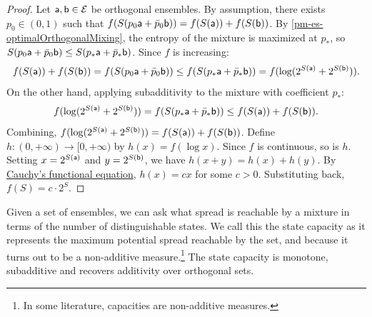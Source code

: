 \begin{mathSection}
	\begin{proof}
		Let $\ens[a],\ens[b]\in\Ens$ be orthogonal ensembles. By assumption, there exists $p_0\in(0,1)$ such that $f(S(p_0\ens[a]+\bar{p}_0\ens[b])) = f(S(\ens[a]))+f(S(\ens[b]))$. By \ref{pm-es-optimalOrthogonalMixing}, the entropy of the mixture is maximized at $p_*$, so $S(p_0\ens[a]+\bar{p}_0\ens[b]) \leq S(p_*\ens[a]+\bar{p}_*\ens[b])$. Since $f$ is increasing:
		\begin{equation}
			f(S(\ens[a]))+f(S(\ens[b])) = f(S(p_0\ens[a]+\bar{p}_0\ens[b])) \leq f(S(p_*\ens[a]+\bar{p}_*\ens[b])) = f(\log(2^{S(\ens[a])}+2^{S(\ens[b])})).
		\end{equation}
		On the other hand, applying subadditivity to the mixture with coefficient $p_*$:
		\begin{equation}
			f(\log(2^{S(\ens[a])}+2^{S(\ens[b])})) = f(S(p_*\ens[a]+\bar{p}_*\ens[b])) \leq f(S(\ens[a]))+f(S(\ens[b])).
		\end{equation}
		Combining, $f(\log(2^{S(\ens[a])}+2^{S(\ens[b])})) = f(S(\ens[a]))+f(S(\ens[b]))$. Define $h:(0,+\infty)\to[0,+\infty)$ by $h(x)=f(\log x)$. Since $f$ is continuous, so is $h$. Setting $x=2^{S(\ens[a])}$ and $y=2^{S(\ens[b])}$, we have $h(x+y)=h(x)+h(y)$. By \href{https://en.wikipedia.org/wiki/Cauchy%27s_functional_equation}{Cauchy's functional equation}, $h(x)=cx$ for some $c>0$. Substituting back, $f(S)=c \cdot 2^S$.
	\end{proof}

\end{mathSection}

Given a set of ensembles, we can ask what spread is reachable by a mixture in terms of the number of distinguishable states. We call this the state capacity as it represents the maximum potential spread reachable by the set, and because it turns out to be a non-additive measure.\footnote{In some literature, capacities are non-additive measures.} The state capacity is monotone, subadditive and recovers additivity over orthogonal sets.


